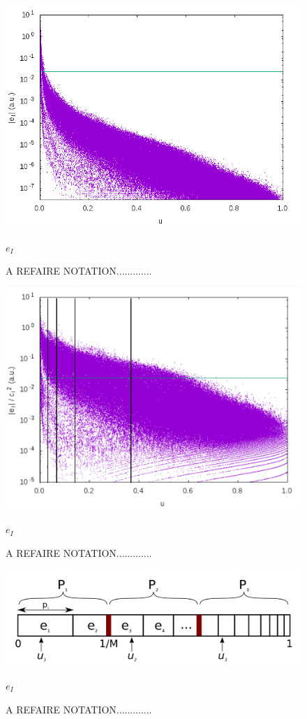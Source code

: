 \documentclass[./thesis.tex]{subfiles}
\begin{document}
\begin{figure}[h!]
	\begin{center}
		\includegraphics[width=0.9\columnwidth]{figures/pt2/eI}
		\caption{A REFAIRE NOTATION.............}
		\label{fig:ei}
		$e_I$
	\end{center}
\end{figure}

\begin{figure}[h!]
	\begin{center}
		\includegraphics[width=0.9\columnwidth]{figures/pt2/eici2comb}
		\caption{A REFAIRE NOTATION.............}
		\label{fig:eici2comb}
		$e_I$
	\end{center}
\end{figure}

\begin{figure}[h!]
	\begin{center}
		\includegraphics[width=0.9\columnwidth]{figures/pt2/comb}
		\caption{A REFAIRE NOTATION.............}
		\label{fig:comb}
		$e_I$
	\end{center}
\end{figure}
\end{document}
